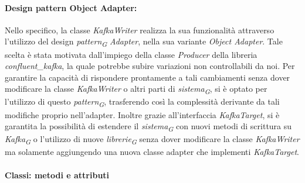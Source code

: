 \paragraph{Design pattern Object Adapter:}
Nello specifico, la classe \textit{KafkaWriter} realizza la sua funzionalità attraverso l'utilizzo del design \textit{pattern}\textsubscript{\textit{G}} \textit{Adapter}, nella sua variante \textit{Object Adapter}. Tale scelta è stata motivata dall'impiego della classe \textit{Producer} della libreria \textit{confluent\_kafka}, la quale potrebbe subire variazioni non controllabili da noi. Per garantire la capacità di rispondere prontamente a tali cambiamenti senza dover modificare la classe \textit{KafkaWriter} o altri parti di \textit{sistema}\textsubscript{\textit{G}}, si è optato per l'utilizzo di questo \textit{pattern}\textsubscript{\textit{G}}, trasferendo così la complessità derivante da tali modifiche proprio nell'adapter.
Inoltre grazie all'interfaccia \textit{KafkaTarget}, si è garantita la possibilità di estendere il \textit{sistema}\textsubscript{\textit{G}} con nuovi metodi di scrittura su \textit{Kafka}\textsubscript{\textit{G}} o l'utilizzo di nuove \textit{librerie}\textsubscript{\textit{G}} senza dover modificare la classe \textit{KafkaWriter} ma solamente aggiungendo una nuova classe adapter che implementi \textit{KafkaTarget}.



\paragraph{Classi: metodi e attributi}

